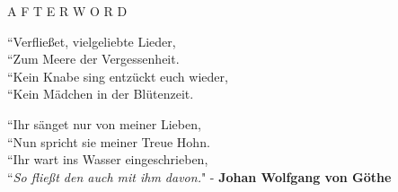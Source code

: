 \documentclass[12pt]{article}
\begin{document}
\begingroup
\begin{center}
\end{center}
\endgroup

\vspace{15\baselineskip}

\begingroup
\begin{center}
\huge A F T E R W O R D
\end{center}
\endgroup

\vspace{3\baselineskip}

\begingroup
``Verfließet, vielgeliebte Lieder,\\
``Zum Meere der Vergessenheit.\\
``Kein Knabe sing entzückt euch wieder,\\
``Kein Mädchen in der Blütenzeit.\\
\endgroup

\begingroup
``Ihr sänget nur von meiner Lieben,\\
``Nun spricht sie meiner Treue Hohn.\\
``Ihr wart ins Wasser eingeschrieben,\\
``\textit{So fließt den auch mit ihm davon.}"
\phantom{text} \hfill - \textbf{Johan Wolfgang von Göthe}\\
\endgroup
\end{document}
